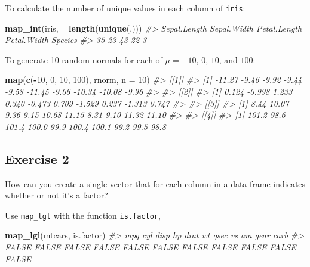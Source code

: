 \documentclass[]{book}
\newenvironment{Shaded}{\begin{snugshade}}{\end{snugshade}}
\newcommand{\CommentTok}[1]{\textcolor[rgb]{0.56,0.35,0.01}{\textit{#1}}}
\newcommand{\DataTypeTok}[1]{\textcolor[rgb]{0.13,0.29,0.53}{#1}}
\newcommand{\DecValTok}[1]{\textcolor[rgb]{0.00,0.00,0.81}{#1}}
\newcommand{\KeywordTok}[1]{\textcolor[rgb]{0.13,0.29,0.53}{\textbf{#1}}}
\newcommand{\NormalTok}[1]{#1}
\newcommand{\OperatorTok}[1]{\textcolor[rgb]{0.81,0.36,0.00}{\textbf{#1}}}
\newcommand{\StringTok}[1]{\textcolor[rgb]{0.31,0.60,0.02}{#1}}
\theoremstyle{plain}
\theoremstyle{remark}
\theoremstyle{definition}
\theoremstyle{definition}
\theoremstyle{definition}
\theoremstyle{remark}
\begin{document}
To calculate the number of unique values in each column of
\texttt{iris}:

\begin{Shaded}
\begin{Highlighting}[]
\KeywordTok{map_int}\NormalTok{(iris, }\OperatorTok{~}\StringTok{ }\KeywordTok{length}\NormalTok{(}\KeywordTok{unique}\NormalTok{(.)))}
\CommentTok{#> Sepal.Length  Sepal.Width Petal.Length  Petal.Width      Species }
\CommentTok{#>           35           23           43           22            3}
\end{Highlighting}
\end{Shaded}

To generate 10 random normals for each of \(\mu = -10\), \(0\), \(10\),
and \(100\):

\begin{Shaded}
\begin{Highlighting}[]
\KeywordTok{map}\NormalTok{(}\KeywordTok{c}\NormalTok{(}\OperatorTok{-}\DecValTok{10}\NormalTok{, }\DecValTok{0}\NormalTok{, }\DecValTok{10}\NormalTok{, }\DecValTok{100}\NormalTok{), rnorm, }\DataTypeTok{n =} \DecValTok{10}\NormalTok{)}
\CommentTok{#> [[1]]}
\CommentTok{#>  [1] -11.27  -9.46  -9.92  -9.44  -9.58 -11.45  -9.06 -10.34 -10.08  -9.96}
\CommentTok{#> }
\CommentTok{#> [[2]]}
\CommentTok{#>  [1]  0.124 -0.998  1.233  0.340 -0.473  0.709 -1.529  0.237 -1.313  0.747}
\CommentTok{#> }
\CommentTok{#> [[3]]}
\CommentTok{#>  [1]  8.44 10.07  9.36  9.15 10.68 11.15  8.31  9.10 11.32 11.10}
\CommentTok{#> }
\CommentTok{#> [[4]]}
\CommentTok{#>  [1] 101.2  98.6 101.4 100.0  99.9 100.4 100.1  99.2  99.5  98.8}
\end{Highlighting}
\end{Shaded}

\hypertarget{exercise-2-58}{%
\subsection{Exercise 2}\label{exercise-2-58}}

How can you create a single vector that for each column in a data frame
indicates whether or not it's a factor?

Use \texttt{map\_lgl} with the function \texttt{is.factor},

\begin{Shaded}
\begin{Highlighting}[]
\KeywordTok{map_lgl}\NormalTok{(mtcars, is.factor)}
\CommentTok{#>   mpg   cyl  disp    hp  drat    wt  qsec    vs    am  gear  carb }
\CommentTok{#> FALSE FALSE FALSE FALSE FALSE FALSE FALSE FALSE FALSE FALSE FALSE}
\end{Highlighting}
\end{Shaded}
\end{document}
